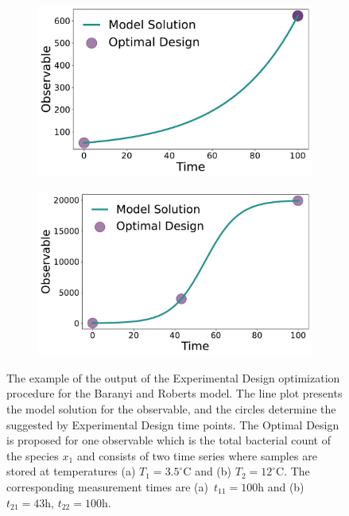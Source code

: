 \documentclass[graybox]{svmult}
\begin{document}
\begin{figure}[H]
    \begin{subfigure}{.5\textwidth}
        \centering
        \includegraphics[scale=0.255]{Figures/Observable_Results_baranyi_roberts_ode_fisher_determinant_rel_sensit_cont_2times_2temps_000_x_00.pdf}
    \end{subfigure}
    \begin{subfigure}{.5\textwidth}
        \centering
        \includegraphics[scale=0.255]{Figures/Observable_Results_baranyi_roberts_ode_fisher_determinant_rel_sensit_cont_2times_2temps_001_x_00.pdf}
    \end{subfigure}
    \caption{{\footnotesize The example of the output of the Experimental Design optimization procedure for the Baranyi and Roberts model.
    The line plot presents the model solution for the observable, and the circles determine the suggested by Experimental Design time points.
    The Optimal Design is proposed for one observable which is the total bacterial count of the species $x_1$ and consists of two time series where samples are stored at temperatures (a) $T_1 = 3.5^\circ$C and (b) $T_2 = 12^\circ$C.
    The corresponding measurement times are (a)~$t_{11}=100$h and (b)~$t_{21}=43$h, $t_{22}=100$h.}}
    \label{fig:baranyi_roberts_observable}
\end{figure}
\end{document}
